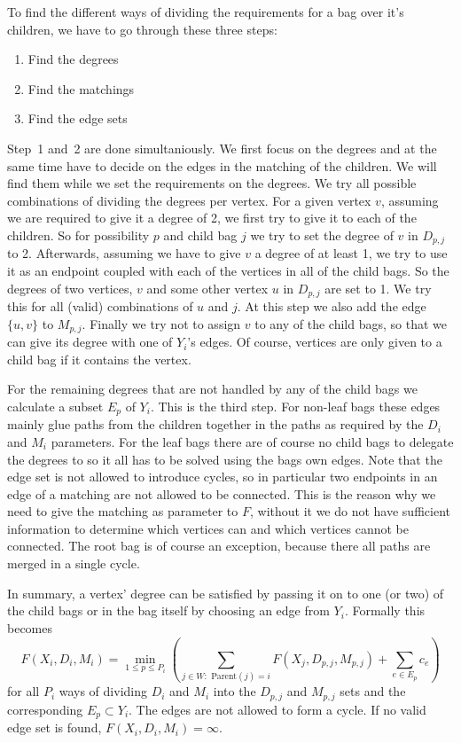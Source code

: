 \documentclass[12pt]{article}
\begin{document}
    To find the different ways of dividing the requirements for a bag over it's children, we have to
    go through these three steps:
    \begin{enumerate}
        \item Find the degrees
        \item Find the matchings
        \item Find the edge sets
    \end{enumerate}
    Step~1 and~2 are done simultaniously. We first focus on the degrees and at the same time have
    to decide on the edges in the matching of the children. We will find them while we set the
    requirements on the degrees.
    We try all possible combinations of dividing the degrees per vertex. For a given vertex $v$,
    assuming we are required to give it a degree of 2, we first try to give it to each of the
    children. So for possibility $p$ and child bag $j$ we try to set the degree of $v$ in $D_{p,j}$
    to 2. Afterwards, assuming we have to give $v$ a degree of at least 1, we try to use it as an
    endpoint coupled with each of the vertices in all of the child bags. So the degrees of two
    vertices, $v$ and some other vertex $u$ in $D_{p,j}$ are set to 1. We try this for all (valid)
    combinations of $u$ and $j$. At this step we also add the edge $\{u, v\}$ to $M_{p,j}$. Finally
    we try not to assign $v$ to any of the child bags, so that we can give its degree with one of
    $Y_i$'s edges.
    Of course, vertices are only given to a child bag if it contains the vertex.

    For the remaining degrees that are not handled by any of the child bags we calculate a subset
    $E_p$ of $Y_i$. This is the third step. For non-leaf bags these edges mainly glue paths from the
    children together in the paths as required by the $D_i$ and $M_i$ parameters. For the leaf bags
    there are of course no child bags to delegate the degrees to so it all has to be solved using
    the bags own edges.
    Note that the edge set is not allowed to introduce cycles, so in particular two endpoints in an
    edge of a matching are not allowed to be connected. This is the reason why we need to give the
    matching as parameter to $F$, without it we do not have sufficient information to determine
    which vertices can and which vertices cannot be connected. The root bag is of course an
    exception, because there all paths are merged in a single cycle.

    In summary, a vertex' degree can be satisfied by passing it on to one (or two) of the child bags
    or in the bag itself by choosing an edge from $Y_i$. Formally this becomes
    \[
        F(X_i, D_i, M_i) = \min_{1 \leq p \leq P_i} (
            \sum_{j \in W :\text{\ Parent}(j) = i} F(X_j, D_{p,j}, M_{p,j}) + \sum_{e \in E_p} c_e
        )
    \]
    for all $P_i$ ways of dividing $D_i$ and $M_i$ into the $D_{p,j}$ and $M_{p,j}$ sets and the
    corresponding $E_p \subset Y_i$. The edges are not allowed to form a cycle.
    If no valid edge set is found, $F(X_i, D_i, M_i) = \infty$.
\end{document}
